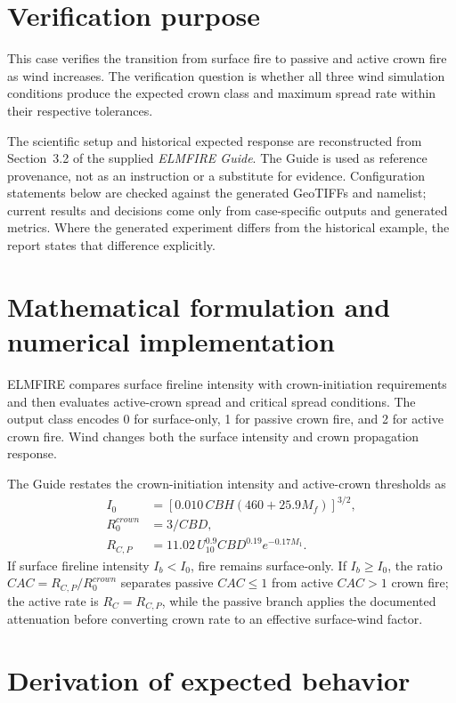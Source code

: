 \section{Verification purpose}

This case verifies the transition from surface fire to passive and active crown fire as wind increases.  The verification question is whether all three wind simulation conditions produce the expected crown class and maximum spread rate within their respective tolerances.

The scientific setup and historical expected response are reconstructed from Section~3.2 of the supplied \emph{ELMFIRE Guide}. The Guide is used as reference provenance, not as an instruction or a substitute for evidence. Configuration statements below are checked against the generated GeoTIFFs and namelist; current results and decisions come only from case-specific outputs and generated metrics. Where the generated experiment differs from the historical example, the report states that difference explicitly.

\section{Mathematical formulation and numerical implementation}

ELMFIRE compares surface fireline intensity with crown-initiation requirements and then evaluates active-crown spread and critical spread conditions.  The output class encodes 0 for surface-only, 1 for passive crown fire, and 2 for active crown fire.  Wind changes both the surface intensity and crown propagation response.

The Guide restates the crown-initiation intensity and active-crown thresholds as
\begin{align}
I_0&=[0.010\,CBH(460+25.9M_f)]^{3/2},\\
R_0^{crown}&=3/CBD,\\
R_{C,P}&=11.02\,U_{10}^{0.9}CBD^{0.19}e^{-0.17M_1}.
\end{align}
If surface fireline intensity \(I_b<I_0\), fire remains surface-only. If \(I_b\ge I_0\), the ratio \(CAC=R_{C,P}/R_0^{crown}\) separates passive \(CAC\le1\) from active \(CAC>1\) crown fire; the active rate is \(R_C=R_{C,P}\), while the passive branch applies the documented attenuation before converting crown rate to an effective surface-wind factor.

\section{Derivation of expected behavior}

